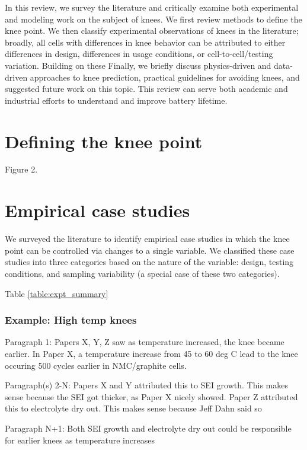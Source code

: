 \documentclass{article}
\begin{document}
In this review, we survey the literature and critically examine both experimental and modeling work on the subject of knees. We first review methods to define the knee point. We then classify experimental observations of knees in the literature; broadly, all cells with differences in knee behavior can be attributed to either differences in design, differences in usage conditions, or cell-to-cell/testing variation. Building on these Finally, we briefly discuss physics-driven and data-driven approaches to knee prediction, practical guidelines for avoiding knees, and suggested future work on this topic. This review can serve both academic and industrial efforts to understand and improve battery lifetime.

\section{Defining the knee point}

Figure 2.

\section{Empirical case studies}

We surveyed the literature to identify empirical case studies in which the knee point can be controlled via changes to a single variable. We classified these case studies into three categories based on the nature of the variable: design, testing conditions, and sampling variability (a special case of these two categories).

Table \ref{table:expt_summary}



\subsubsection{Example: High temp knees}
Paragraph 1:
Papers X, Y, Z saw as temperature increased, the knee became earlier.
In Paper X, a temperature increase from 45 to 60 deg C lead to the knee occuring 500 cycles earlier in NMC/graphite cells.

Paragraph(s) 2-N:
Papers X and Y attributed this to SEI growth. This makes sense because the SEI got thicker, as Paper X nicely showed.
Paper Z attributed this to electrolyte dry out. This makes sense because Jeff Dahn said so

Paragraph N+1:
Both SEI growth and electrolyte dry out could be responsible for earlier knees as temperature increases
\end{document}
